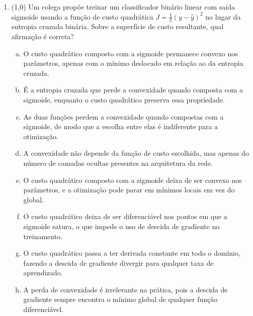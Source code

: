 \documentclass[11pt,a4paper]{article}
\begin{document}
\begin{enumerate}[1)]
\item (1{,}0) Um colega propõe treinar um classificador binário linear com saída sigmoide usando a função de custo quadrática $J = \tfrac{1}{2}(y - \hat{y})^2$ no lugar da entropia cruzada binária. Sobre a superfície de custo resultante, qual afirmação é correta?
\begin{enumerate}[a)]
    \item O custo quadrático composto com a sigmoide permanece convexo nos parâmetros, apenas com o mínimo deslocado em relação ao da entropia cruzada.
    \item É a entropia cruzada que perde a convexidade quando composta com a sigmoide, enquanto o custo quadrático preserva essa propriedade.
    \item As duas funções perdem a convexidade quando compostas com a sigmoide, de modo que a escolha entre elas é indiferente para a otimização.
    \item A convexidade não depende da função de custo escolhida, mas apenas do número de camadas ocultas presentes na arquitetura da rede.
    \item O custo quadrático composto com a sigmoide deixa de ser convexo nos parâmetros, e a otimização pode parar em mínimos locais em vez do global.
    \item O custo quadrático deixa de ser diferenciável nos pontos em que a sigmoide satura, o que impede o uso de descida de gradiente no treinamento.
    \item O custo quadrático passa a ter derivada constante em todo o domínio, fazendo a descida de gradiente divergir para qualquer taxa de aprendizado.
    \item A perda de convexidade é irrelevante na prática, pois a descida de gradiente sempre encontra o mínimo global de qualquer função diferenciável.
\end{enumerate}

\end{enumerate}
\end{document}
